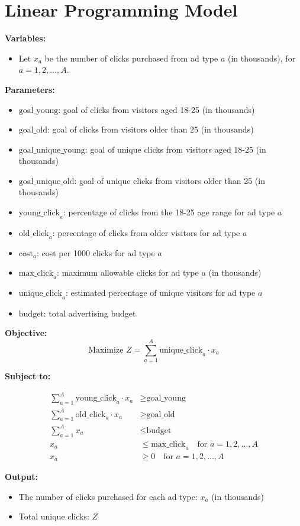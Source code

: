 \documentclass{article}
\begin{document}
\section*{Linear Programming Model}

\textbf{Variables:}
\begin{itemize}
    \item Let \( x_a \) be the number of clicks purchased from ad type \( a \) (in thousands), for \( a = 1, 2, \ldots, A \).
\end{itemize}

\textbf{Parameters:}
\begin{itemize}
    \item \( \text{goal\_young} \): goal of clicks from visitors aged 18-25 (in thousands)
    \item \( \text{goal\_old} \): goal of clicks from visitors older than 25 (in thousands)
    \item \( \text{goal\_unique\_young} \): goal of unique clicks from visitors aged 18-25 (in thousands)
    \item \( \text{goal\_unique\_old} \): goal of unique clicks from visitors older than 25 (in thousands)
    \item \( \text{young\_click}_{a} \): percentage of clicks from the 18-25 age range for ad type \( a \)
    \item \( \text{old\_click}_{a} \): percentage of clicks from older visitors for ad type \( a \)
    \item \( \text{cost}_{a} \): cost per 1000 clicks for ad type \( a \)
    \item \( \text{max\_click}_{a} \): maximum allowable clicks for ad type \( a \) (in thousands)
    \item \( \text{unique\_click}_{a} \): estimated percentage of unique visitors for ad type \( a \)
    \item \( \text{budget} \): total advertising budget
\end{itemize}

\textbf{Objective:}
\[
\text{Maximize } Z = \sum_{a=1}^{A} \text{unique\_click}_{a} \cdot x_a
\]

\textbf{Subject to:}

\begin{align*}
\sum_{a=1}^{A} \text{young\_click}_{a} \cdot x_a & \geq \text{goal\_young} \\
\sum_{a=1}^{A} \text{old\_click}_{a} \cdot x_a & \geq \text{goal\_old} \\
\sum_{a=1}^{A} x_a & \leq \text{budget} \\
x_a & \leq \text{max\_click}_{a} \quad \text{for } a = 1, 2, \ldots, A \\
x_a & \geq 0 \quad \text{for } a = 1, 2, \ldots, A
\end{align*}

\textbf{Output:}
\begin{itemize}
    \item The number of clicks purchased for each ad type: \( x_a \) (in thousands)
    \item Total unique clicks: \( Z \)
\end{itemize}
\end{document}
